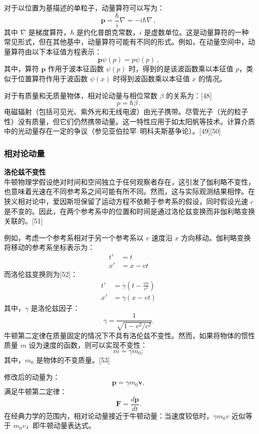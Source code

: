 对于以位置为基描述的单粒子，动量算符可以写为：
\[
\mathbf{p} = \frac{\hbar}{i} \nabla = -i \hbar \nabla \,,~
\]
其中 \(\nabla\) 是梯度算符，\(\hbar\) 是约化普朗克常数，\(i\) 是虚数单位。这是动量算符的一种常见形式，但在其他基中，动量算符可能有不同的形式。例如，在动量空间中，动量算符由以下本征值方程表示：
\[
\mathbf{p} \psi (p) = p \psi (p) \,,~
\]
其中，算符 \(\mathbf{p}\) 作用于波本征函数 \(\psi(p)\) 时，得到的是该波函数乘以本征值 \(p\)，类似于位置算符作用于波函数 \(\psi(x)\) 时得到波函数乘以本征值 \(x\) 的情况。

对于有质量和无质量物体，相对论动量与相位常数 \(\beta\) 的关系为：[48]
\[
p = \hbar \beta \,.~
\]
电磁辐射（包括可见光、紫外光和无线电波）由光子携带。尽管光子（光的粒子性）没有质量，但它们仍然携带动量。这一特性应用于如太阳帆等技术。计算介质中的光动量存在一定的争议（参见亚伯拉罕–明科夫斯基争论）。[49][50]
\subsubsection{相对论动量}
\textbf{洛伦兹不变性} \\
牛顿物理学假设绝对时间和空间独立于任何观察者存在，这引发了伽利略不变性，也意味着光速在不同参考系之间可能有所不同。然而，这与实际观测结果相悖。在狭义相对论中，爱因斯坦保留了运动方程不依赖于参考系的假设，同时假设光速 \( c \) 是不变的。因此，在两个参考系中的位置和时间是通过洛伦兹变换而非伽利略变换关联的。[51]

例如，考虑一个参考系相对于另一个参考系以 \( v \) 速度沿 \( x \) 方向移动。伽利略变换将移动的参考系坐标表示为：
\[
{\begin{aligned}
t' &= t \\
x' &= x - vt
\end{aligned}}~
\]
而洛伦兹变换则为[52]：
\[
{\begin{aligned}
t' &= \gamma \left(t - \frac{vx}{c^2}\right) \\
x' &= \gamma \left(x - vt\right)
\end{aligned}}~
\]
其中，\( \gamma \) 是洛伦兹因子：
\[
\gamma = \frac{1}{\sqrt{1 - v^2/c^2}}.~
\]
牛顿第二定律在质量固定的情况下不具有洛伦兹不变性。然而，如果将物体的惯性质量 \( m \) 设为速度的函数，则可以实现不变性：
\[
m = \gamma m_0;~
\]
其中，\( m_0 \) 是物体的不变质量。[53]

修改后的动量为：
\[
\mathbf{p} = \gamma m_0 \mathbf{v},~
\]
满足牛顿第二定律：
\[
\mathbf{F} = \frac{d\mathbf{p}}{dt}.~
\]
在经典力学的范围内，相对论动量接近于牛顿动量：当速度较低时，\( \gamma m_0 v \) 近似等于 \( m_0 v \)，即牛顿动量表达式。


